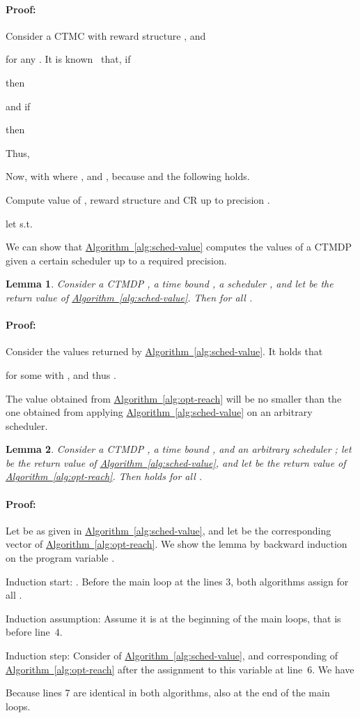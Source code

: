 \documentclass[10pt,twocolumn]{article}
\newenvironment{proof}{\paragraph{Proof:}}{\hfill}
\newtheorem{lemma}{Lemma}
\newcommand{\refalg}[1]{\texorpdfstring{\hyperref[alg:#1]{Algorithm~\ref*{alg:#1}}}{Algorithm~\ref*{alg:#1}}}
\begin{document}
\begin{proof}
Consider a CTMC  with reward structure , and

for any .
It is known~\cite[remark below Theorem 2]{KwiatkowskaNP06} that, if

then

and if

then


Thus,


Now, with  where , and ,
because  and  the following holds.


\end{proof}

\begin{algorithm}
  \caption{\label{alg:sched-value} Compute value of , reward structure  and CR  up to precision .}
  \DontPrintSemicolon
  let  s.t. \;
   \;
  \lForAll{} { \;
  }
  \ForAll{} {
    \ForAll{} {
       \;
       \;
    }
  }
  \Return 
\end{algorithm}

We can show that \refalg{sched-value} computes the values of a CTMDP given a certain scheduler up to a required precision.
\begin{lemma}
\label{lem:sched-value-prec}
Consider a CTMDP , a time bound , a scheduler , and let  be the return value of \refalg{sched-value}.
Then  for all .
\end{lemma}

\begin{proof}
Consider the values  returned by \refalg{sched-value}.
It holds that

for some  with , and thus .
\end{proof}


The value obtained from \refalg{opt-reach} will be no smaller than the one obtained from applying \refalg{sched-value} on an arbitrary scheduler.
\begin{lemma}
\label{lem:opt-val-nosmaller}
Consider a CTMDP , a time bound , and an arbitrary scheduler ;
let  be the return value of \refalg{sched-value}, and let  be the return value of \refalg{opt-reach}.
Then  holds for all .
\end{lemma}

\begin{proof}
  Let  be as given in \refalg{sched-value}, and let  be the corresponding vector of \refalg{opt-reach}.
  We show the lemma by backward induction on the program variable .

  Induction start: . Before the main loop at the lines 3, both algorithms assign  for all .

  Induction assumption: Assume it is  at the beginning of the main loops, that is before line~4.

  Induction step: Consider  of \refalg{sched-value}, and corresponding  of \refalg{opt-reach} after the assignment to this variable at line~6.
  We have

Because lines 7 are identical in both algorithms, also  at the end of the main loops.  
\end{proof}
\end{document}
